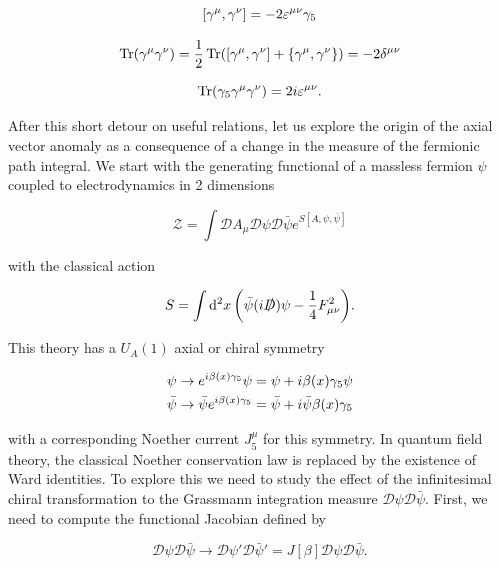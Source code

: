 \begin{equation}
   \comm{\gmu}{\gnu} = -2\eumn\gf 
\end{equation}

\begin{equation}
    \Tr(\gmu \gnu) = \frac{1}{2} \Tr(\comm{\gmu}{\gnu} + \acomm{\gmu}{\gnu}) = -2\delta^{\mu\nu} 
\end{equation}

\begin{equation}
    \Tr(\gamma_5 \gamma^\mu \gamma^\nu) = 2 i \varepsilon^{\mu\nu}.
\end{equation}

After this short detour on useful relations, let us explore the origin of the axial vector anomaly as a consequence of a change in the measure of the fermionic path integral. We start with the generating functional of a massless fermion $\psi$ coupled to electrodynamics in 2 dimensions

\begin{equation}
    \mathcal Z = \int \mathcal{D}A_\mu \mathcal{D}\psi \mathcal{D}\bar\psi e^{S[A,\psi,\bar\psi]}
\end{equation}

with the classical action 

\begin{equation}
    S = \int \dd[2]{x} \qty(\bar\psi (i\slashed{D})\psi - \frac{1}{4} F_{\mu\nu}^2).
\end{equation}

This theory has a $U_A(1)$ axial or chiral symmetry 

\begin{align}
    \psi\to e^{i\beta(x)\gamma_5}\psi &= \psi + i \beta(x)\gamma_5\psi\nonumber\\
    \bar\psi \to \bar\psi e^{i\beta(x)\gamma_5} &= \bar\psi + i\bar\psi\beta(x)\gamma_5
    \label{eq:chiraltrans}
\end{align}

with a corresponding Noether current $J_5^\mu$ for this symmetry. In quantum field theory, the classical Noether conservation law is replaced by the existence of Ward identities. To explore this we need to study the effect of the infinitesimal chiral transformation to the Grassmann integration measure $\mathcal{D}\psi \mathcal{D}\bar\psi$. First, we need to compute the functional Jacobian defined by

\begin{equation}
    \mathcal{D}\psi \mathcal{D}\bar\psi \to \mathcal{D}\psi' \mathcal{D}\bar\psi' = J[\beta]\mathcal{D}\psi \mathcal{D}\bar\psi.
\end{equation}


